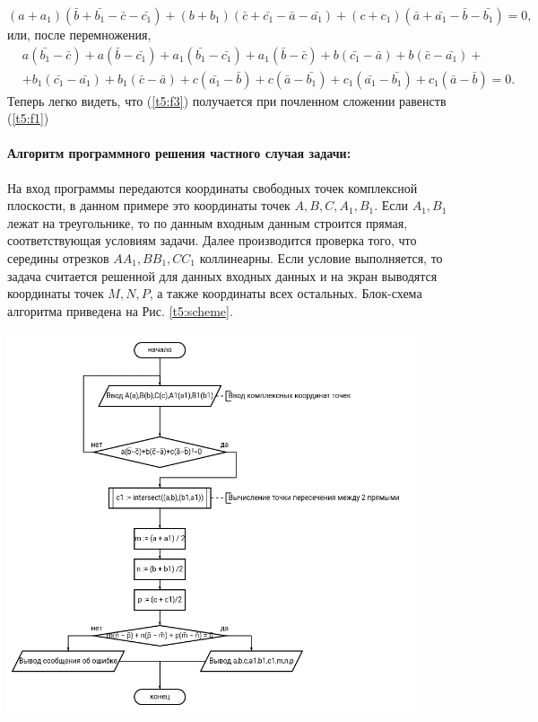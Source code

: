 {   \(
   (a+a_1)(\bar{b}+\bar{b_1}-\bar{c}-\bar{c_1})+(b+b_1 )(\bar{c}+\bar{c_1}-\bar{a}-\bar{a_1})+(c+c_1)(\bar{a}+\bar{a_1}-\bar{b}-\bar{b_1})=0,
   \) или, после перемножения,
   \begin{equation}
      \begin{aligned}
          & a(\bar{b_1} - \bar{c}) + a(\bar{b}- \bar{c_1}) + a_1(\bar{b_1} - \bar{c_1}) + a_1(\bar{b}- \bar{c}) + b(\bar{c_1} - \bar{a}) + b(\bar{c}- \bar{a_1}) + \\
          & +b_1(\bar{c_1}-\bar{a_1})+b_1 (\bar{c}-\bar{a})+c(\bar{a_1}-\bar{b})+c(\bar{a}-\bar{b_1})+c_1 (\bar{a_1}-\bar{b_1} )+c_1(\bar{a}-\bar{b})=0.
      \end{aligned}
      \label{t5:f3}
   \end{equation}
   Теперь легко видеть, что (\ref{t5:f3}) получается при почленном сложении
   равенств (\ref{t5:f1})
   \paragraph{Алгоритм программного решения частного случая задачи:} На вход программы передаются координаты
   свободных точек комплексной плоскости, в данном примере это координаты точек \(A,B,C,A_1,B_1\). Если \(A_1,B_1\)
   лежат на треугольнике, то по данным входным данным строится прямая, соответствующая условиям задачи. Далее
   производится проверка того, что середины отрезков \(AA_1,BB_1,CC_1\) коллинеарны. Если условие выполняется, то задача
   считается решенной для данных входных данных и на экран выводятся координаты точек \(M,N,P\), а также координаты
   всех остальных. Блок-схема алгоритма приведена на Рис. \ref{t5:scheme}.
   \begin{center}
      \includegraphics[width=0.9\textwidth]{images/task5-diagram.png}
      \label{t5:scheme}
   \end{center}

}
